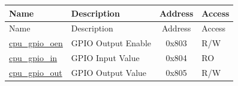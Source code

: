 \begin{longtable}{ | p{4.0cm} | p{8.4cm} | c | l | }
\hline\rowcolor{lightgray}
Name & Description & Address & Access \\ \hline
\endfirsthead
\hline
\rowcolor{lightgray}
Name & Description & Address & Access \\
\hline
\endhead
\endfoot
\hyperref[regdesc:GPIO_OEN]{cpu\_gpio\_oen} & GPIO Output Enable & 0x803 & R/W \\\hline
\hyperref[regdesc:GPIO_IN]{cpu\_gpio\_in} & GPIO Input Value & 0x804 & RO \\\hline
\hyperref[regdesc:GPIO_OUT]{cpu\_gpio\_out} & GPIO Output Value & 0x805 & R/W \\\hline
\end{longtable}